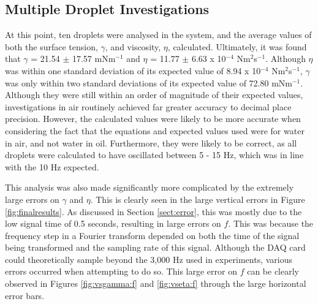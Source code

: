 \documentclass{physics_article_B}
\begin{document}
    \subsection{Multiple Droplet Investigations\label{sect:results:multi}}
    
        At this point, ten droplets were analysed in the system, and the average values of both the surface tension, $\gamma$, and viscosity, $\eta$, calculated. Ultimately, it was found that $\gamma$ = 21.54 $\pm$ 17.57 mNm$^{-1}$ and $\eta$ = 11.77 $\pm$ 6.63 x 10$^{-4}$ Nm$^{2}$s$^{-1}$. Although $\eta$ was within one standard deviation of its expected value\cite{expected2} of 8.94 x 10$^{-4}$ Nm$^{2}$s$^{-1}$, $\gamma$ was only within two standard deviations of its expected value\cite{expected1} of 72.80 mNm$^{-1}$. Although they were still within an order of magnitude of their expected values, investigations in air routinely achieved far greater accuracy to decimal place precision. However, the calculated values were likely to be more accurate when considering the fact that the equations and expected values used were for water in air, and not water in oil. Furthermore, they were likely to be correct, as all droplets were calculated to have oscillated between 5 - 15 Hz, which was in line with the 10 Hz expected. 
        
        This analysis was also made significantly more complicated by the extremely large errors on $\gamma$ and $\eta$. This is clearly seen in the large vertical errors in Figure \ref{fig:finalresults}. As discussed in Section \ref{sect:error}, this was mostly due to the low signal time of 0.5 seconds, resulting in large errors on $f$. This was because the frequency step in a Fourier transform depended on both the time of the signal being transformed and the sampling rate of this signal. Although the DAQ card could theoretically sample beyond the 3,000 Hz used in experiments, various errors occurred when attempting to do so. This large error on $f$ can be clearly observed in Figures \ref{fig:vsgamma:f} and \ref{fig:vseta:f} through the large horizontal error bars. 
    
\end{document}
